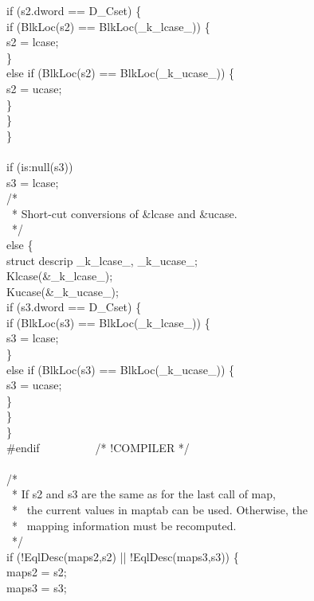 {\>\>\>if (s2.dword == D\_Cset) \{\\
\>\>\>\>if (BlkLoc(s2) == BlkLoc(\_k\_lcase\_)) \{\\
\>\>\>\>s2 = lcase;\\
\>\>\>\}\\
\>\>\>else if (BlkLoc(s2) == BlkLoc(\_k\_ucase\_)) \{\\
\>\>\>\>s2 = ucase;\\
\>\>\>\}\\
\>\>\}\\
\>\}\\
\\
\>\>if (is:null(s3))\\
\>\>\>s3 = lcase;\\
\>\>/*\\
\>\>\ * Short-cut conversions of \&lcase and \&ucase.\\
\>\>\ */\\
\>\>else \{\\
\>\>\>struct descrip \_k\_lcase\_, \_k\_ucase\_;\\
\>\>\>Klcase(\&\_k\_lcase\_);\\
\>\>\>Kucase(\&\_k\_ucase\_);\\
\>\>\>if (s3.dword == D\_Cset) \{\\
\>\>\>\>if (BlkLoc(s3) == BlkLoc(\_k\_lcase\_)) \{\\
\>\>\>\>\>s3 = lcase;\\
\>\>\>\>\>\}\\
\>\>\>\>else if (BlkLoc(s3) == BlkLoc(\_k\_ucase\_)) \{\\
\>\>\>\>\>s3 = ucase;\\
\>\>\>\>\>\}\\
\>\>\>\>\}\\
\>\>\>\}\\
\#endif\ \ \ \ \ \ \ \ \ \ /* !COMPILER */\\
\\
\>\>/*\\
\>\>\ * If s2 and s3 are the same as for the last call of map,\\
\>\>\ * \ the current values in maptab can be used. Otherwise, the\\
\>\>\ * \ mapping information must be recomputed.\\
\>\>\ */\\
\>\>if (!EqlDesc(maps2,s2) || !EqlDesc(maps3,s3)) \{\\
\>\>\>maps2 = s2;\\
\>\>\>maps3 = s3;\\
\\
}
